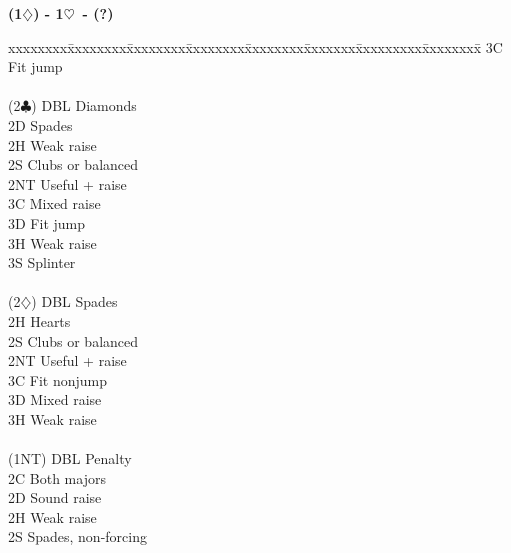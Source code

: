 \documentclass[10pt]{article}
\renewcommand{\c}{$\clubsuit$}
\renewcommand{\d}{$\diamondsuit$}
\newcommand{\h}{$\heartsuit$}
\newenvironment{bidtable}[1][]
{\textbf{#1}
  \begin{adjustwidth}{1em}{}
    \addvspace{2pt}
    \begin{tabbing}
      xxxxxxxx\=xxxxxxxx\=xxxxxxxx\=xxxxxxxx\=xxxxxxxx\=xxxxxxx\=xxxxxxxxx\=xxxxxxxx\=\kill}
{\end{tabbing}\end{adjustwidth}\bigskip}%
\begin{document}
\begin{bidtable}[(1\d) - 1\h\ - (?)]
       \> 3C     \> Fit jump                                         \\
                                                                     \\
(2\c)  \> DBL    \> Diamonds                                         \\
       \> 2D     \> Spades                                           \\
       \> 2H     \> Weak raise                                       \\
       \> 2S     \> Clubs or balanced                                \\
       \> 2NT    \> Useful + raise                                   \\
       \> 3C     \> Mixed raise                                      \\
       \> 3D     \> Fit jump                                         \\
       \> 3H     \> Weak raise                                       \\
       \> 3S     \> Splinter                                         \\
                                                                     \\
(2\d)  \> DBL    \> Spades                                           \\
       \> 2H     \> Hearts                                           \\
       \> 2S     \> Clubs or balanced                                \\
       \> 2NT    \> Useful + raise                                   \\
       \> 3C     \> Fit nonjump                                      \\
       \> 3D     \> Mixed raise                                      \\
       \> 3H     \> Weak raise                                       \\
                                                                     \\
(1NT)  \> DBL    \> Penalty                                          \\
       \> 2C     \> Both majors                                      \\
       \> 2D     \> Sound raise                                      \\
       \> 2H     \> Weak raise                                       \\
       \> 2S     \> Spades, non-forcing
\end{bidtable}
\end{document}
